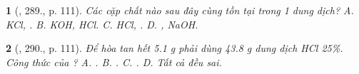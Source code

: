 \documentclass{article}
\newtheorem{baitoan}{}
\begin{document}
\begin{baitoan}[\cite{Nguyen_Buu_Can_500_BT_Hoa_Hoc_THCS}, 289., p. 111]
	Các cặp chất nào sau đây cùng tồn tại trong 1 dung dịch? {\rm{\sf A.} KCl, . {\sf B.} KOH, HCl. {\sf C.} HCl, . {\sf D.} , NaOH}.
\end{baitoan}

\begin{baitoan}[\cite{Nguyen_Buu_Can_500_BT_Hoa_Hoc_THCS}, 290., p. 111]
	Để hòa tan hết {\rm5.1 g } phải dùng {\rm43.8 g} dung dịch {\rm HCl 25\%}. Công thức của {\rm{}}? {\rm{\sf A.} . {\sf B.} . {\sf C.} .} {\sf D.} Tất cả đều sai.
\end{baitoan}


\printbibliography[heading=bibintoc]
\end{document}
